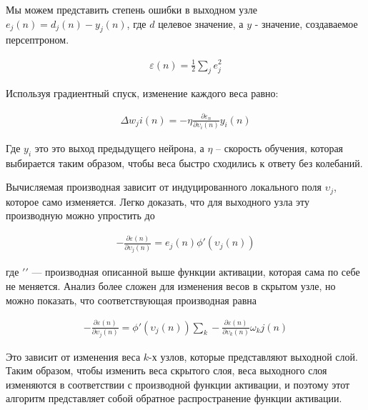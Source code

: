 Мы можем представить степень ошибки в выходном узле $e_j(n) = d_j(n) - y_j(n)$, где $d$
целевое значение, а $y$ - значение, создаваемое персептроном.

\begin{equation}
  \begin{gathered}
    \varepsilon (n) = \frac{1}{2} \sum_j e_j^2
  \end{gathered}
  \label{eq:speach_formula_16}
\end{equation}

Используя градиентный спуск, изменение каждого веса равно:

\begin{equation}
  \begin{gathered}
    \Delta w_ji(n) = -\eta \frac{\partial \varepsilon_n}{\partial \upsilon_i (n)} y_i(n)
  \end{gathered}
  \label{eq:speach_formula_17}
\end{equation}

Где $y_i$ это это выход предыдущего нейрона, а $\eta$ – скорость обучения, 
которая выбирается таким образом, чтобы веса быстро сходились к ответу без колебаний.

Вычисляемая производная зависит от индуцированного локального поля $\upsilon_j$,
которое само изменяется. Легко доказать, что для выходного узла эту производную можно упростить до

\begin{equation}
  \begin{gathered}
    - \frac{\partial \varepsilon (n)}{\partial \upsilon_j (n)} = e_j(n) {\phi}'(\upsilon_j(n))
  \end{gathered}
  \label{eq:speach_formula_18}
\end{equation}

где ${\prime}'$ — производная описанной выше функции активации, которая сама по 
себе не меняется. Анализ более сложен для изменения весов в скрытом узле, 
но можно показать, что соответствующая производная равна

\begin{equation}
  \begin{gathered}
    - \frac{\partial \varepsilon (n)}{\partial \upsilon_j (n)} = {\phi}'(\upsilon_j(n)) \sum_k - \frac{\partial \varepsilon(n)}{\partial \upsilon_k(n)} \omega_kj(n)
  \end{gathered}
  \label{eq:speach_formula_19}
\end{equation}

Это зависит от изменения веса $k$-х узлов, которые представляют выходной слой. 
Таким образом, чтобы изменить веса скрытого слоя, веса выходного слоя изменяются 
в соответствии с производной функции активации, и поэтому этот алгоритм представляет собой обратное распространение функции активации.

